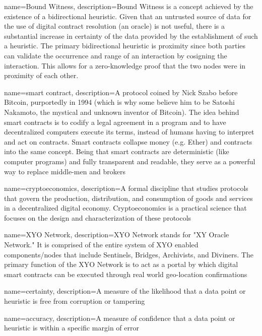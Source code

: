 \documentclass{article}
\begin{document}
{
    name={Bound Witness},
    description={Bound Witness is a concept achieved by the existence of a bidirectional heuristic. Given that an untrusted source of data for the use of digital contract resolution (an oracle) is not useful, there is a substantial increase in certainty of the data provided by the establishment of such a heuristic. The primary bidirectional heuristic is proximity since both parties can validate the occurrence and range of an interaction by cosigning the interaction. This allows for a zero-knowledge proof that the two nodes were in proximity of each other.}
}

{
    name={smart contract},
    description={A protocol coined by Nick Szabo before Bitcoin, purportedly in 1994 (which is why some believe him to be Satoshi Nakamoto, the mystical and unknown inventor of Bitcoin). The idea behind smart contracts is to codify a legal agreement in a program and to have decentralized computers execute its terms, instead of humans having to interpret and act on contracts. Smart contracts collapse money (e.g. Ether) and contracts into the same concept. Being that smart contracts are deterministic (like computer programs) and fully transparent and readable, they serve as a powerful way to replace middle-men and brokers}
}

{
    name={cryptoeconomics},
    description={A formal discipline that studies protocols that govern the production, distribution, and consumption of goods and services in a decentralized digital economy. Cryptoeconomics is a practical science that focuses on the design and characterization of these protocols}
}

{
    name={XYO Network},
    description={XYO Network stands for "XY Oracle Network." It is comprised of the entire system of XYO enabled components/nodes that include Sentinels, Bridges, Archivists, and Diviners. The primary function of the XYO Network is to act as a portal by which digital smart contracts can be executed through real world geo-location confirmations}
}

{
    name={certainty},
    description={A measure of the likelihood that a data point or heuristic is free from corruption or tampering}
}

{
    name={accuracy},
    description={A measure of confidence that a data point or heuristic is within a specific margin of error}
}
\end{document}
